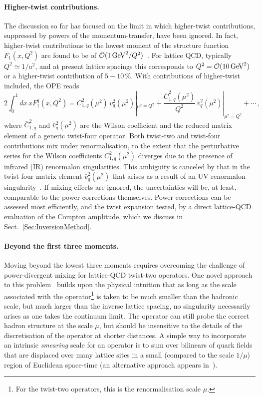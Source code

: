 \paragraph{Higher-twist contributions.}
%
The discussion so far has focused on the limit in which higher-twist 
contributions, suppressed by powers of the momentum-transfer, 
have been ignored. 
%
In fact, higher-twist contributions to the lowest moment of the structure 
function $F_1(x,Q^2)$ are found to be of 
${\cal O}(1\, \mbox{GeV}^2/Q^2)$~\cite{Blumlein:2008kz}.
%
For lattice QCD, typically $Q^2 \simeq 1/a^2$, and at present lattice spacings 
this corresponds to $Q^2 = {\cal O}(10\,\mbox{GeV}^2)$ or a higher-twist 
contribution of $5 - 10\, \%$. 
%
With contributions of higher-twist included, the OPE reads
\begin{equation}
2 \int_0^1 dx\, x F_1^q(x,Q^2) 
= C_{1,q}^2(\mu^2)\, v_q^2(\mu^2)|_{\mu^2=Q^2} 
+ \frac{\bar{C}_{1,q}^2(\mu^2)}{Q^2}\, \bar{v}_q^2(\mu^2)|_{\mu^2=Q^2} + \cdots \,,
\label{tex}
\end{equation}
where $\bar{C}_{1,q}^2$ and $\bar{v}_q^2(\mu^2)$ are the Wilson coefficient 
and the reduced matrix element of a generic twist-four operator. 
%
Both twist-two and twist-four contributions mix under renormalisation, 
to the extent that the perturbative series for the Wilson coefficients 
$C_{1,q}^2(\mu^2)$ diverges due to the presence of infrared (IR) 
renormalon singularities.
%
This ambiguity is canceled by that in the twist-four matrix element 
$\bar{v}_q^2(\mu^2)$ that arises as a result of an UV renormalon 
singularity~\cite{Martinelli:1996pk}. 
%
If mixing effects are ignored, the uncertainties will be, at least, comparable 
to the power corrections themselves.
%
Power corrections can be assessed most efficiently, and the twist expansion 
tested, by a direct lattice-QCD evaluation of the Compton amplitude, 
which we discuss in Sect.~\ref{Sec:InversionMethod}.

\paragraph{Beyond the first three moments.}
Moving beyond the lowest three moments requires overcoming the challenge of 
power-divergent mixing for lattice-QCD twist-two operators.
%
One novel approach to this problem~\cite{Davoudi:2012ya} builds upon the 
physical intuition that as long as the scale associated with the 
operator\footnote{For the twist-two operators, this is the renormalisation 
scale $\mu$.} is taken to be much smaller than the hadronic scale, but much 
larger than the inverse lattice spacing, no singularity necessarily arises 
as one takes the continuum limit.
%
The operator can still probe the correct hadron structure at the scale $\mu$, 
but should be insensitive to the details of the discretisation of the operator 
at shorter distances.
%
A simple way to incorporate an intrinsic {\it smearing} scale for an operator 
is to sum over bilinears of quark fields that are displaced over many lattice 
sites in a small (compared to the scale $1/\mu$) region of Euclidean 
space-time (an alternative approach appears in~\cite{Monahan:2015lha}).


